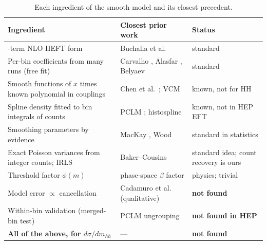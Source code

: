\begin{table}[h]
\centering\small
\begin{tabularx}{\linewidth}{@{}>{\raggedright\arraybackslash}p{4.2cm}
  >{\raggedright\arraybackslash}X >{\raggedright\arraybackslash}p{2.6cm}@{}}
\toprule
Ingredient & Closest prior work & Status \\
\midrule
23-term NLO HEFT form & Buchalla et al.\ \cite{Buchalla2018} & standard \\
Per-bin coefficients from many runs (free fit) & Carvalho \cite{Carvalho2017}, Alasfar
  \cite{Alasfar2023}, Belyaev \cite{Belyaev2025} & standard \\
Smooth functions of $x$ times known polynomial in couplings
  & Chen et al.\ \cite{Chen2021}; VCM \cite{HastieTibshirani1993} & known, not for HH \\
Spline density fitted to bin integrals of counts & PCLM \cite{Eilers2007,Rizzi2015};
  histospline \cite{Boneva1971} & known, not in HEP EFT \\
Smoothing parameters by evidence & MacKay \cite{MacKay1992}, Wood \cite{Wood2011}
  & standard in statistics \\
Exact Poisson variances from integer counts; IRLS & Baker--Cousins \cite{BakerCousins1984}
  & standard idea; count recovery is ours \\
Threshold factor $\phi(m)$ & phase-space $\beta$ factor & physics; trivial \\
Model error $\propto$ cancellation & Cadamuro et al.\ \cite{Cadamuro2025} (qualitative)
  & \textbf{not found} \\
Within-bin validation (merged-bin test) & PCLM ungrouping & \textbf{not found in HEP} \\
\textbf{All of the above, for $d\sigma/dm_{hh}$} & --- & \textbf{not found} \\
\bottomrule
\end{tabularx}
\caption{Each ingredient of the smooth model and its closest precedent.}
\label{tab:synth}
\end{table}

